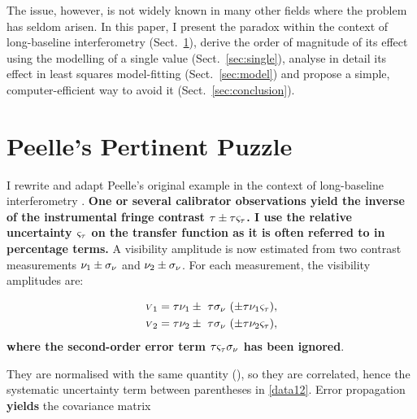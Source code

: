 \documentclass{pasa}
\def\correction#1{{\bfseries #1}}
\begin{document}
The issue, however, is not widely known in many other fields where the problem has seldom arisen.  In this paper, I present the paradox within the context of long-baseline interferometry (Sect.~\ref{sec:ppp}), derive the order of magnitude of its effect using the modelling of a single value (Sect.~\ref{sec:single}), analyse in detail its effect in least squares model-fitting (Sect.~\ref{sec:model}) and propose a simple, computer-efficient way to avoid it (Sect.~\ref{sec:conclusion}).  

\section{Peelle's Pertinent Puzzle}
\label{sec:ppp}
I rewrite and adapt Peelle's original example in the context of long-baseline interferometry \correction{\citep[see][Sect.~1 \& 2.1]{NEU12}}. \correction{One or several calibrator observations yield the inverse of the instrumental fringe contrast $\tau \pm \tau\varsigma_\tau$.  I use the relative uncertainty $\varsigma_\tau$ on the transfer function as it is often referred to in percentage terms.} A visibility amplitude is now estimated from two contrast measurements $\nu_1 \pm \sigma_\nu$ and $\nu_2 \pm \sigma_\nu$.  For each measurement, the visibility amplitudes are:

\begin{subequations}
\begin{align}
    {\scriptstyle V}_1 &= \tau\nu_1 \pm\ \tau\sigma_\nu\ (\pm \tau\nu_1\varsigma_\tau),\\
    {\scriptstyle V}_2 &= \tau\nu_2 \pm\ \tau\sigma_\nu\ (\pm \tau\nu_2\varsigma_\tau),
\end{align}
\label{eq:data12}
\end{subequations}
\correction{where the second-order error term $\tau\varsigma_\tau\sigma_\nu$ has been ignored}.

They are normalised with the same quantity (\cot), so they are correlated, hence the systematic uncertainty term between parentheses in \eqref{data12}. Error propagation \correction{yields} the covariance matrix
\end{document}
